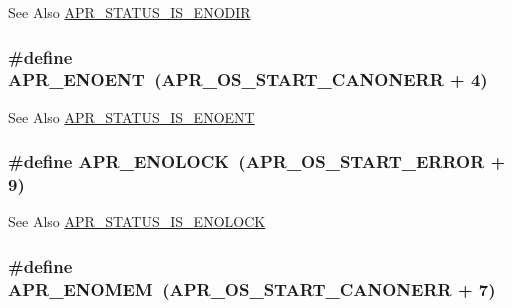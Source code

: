 \begin{DoxySeeAlso}{See Also}
\hyperlink{group___a_p_r___s_t_a_t_u_s___i_s_ga666c0bcfb97d26df7e7e360041d93fc6}{A\-P\-R\-\_\-\-S\-T\-A\-T\-U\-S\-\_\-\-I\-S\-\_\-\-E\-N\-O\-D\-I\-R} 
\end{DoxySeeAlso}
\hypertarget{group___a_p_r___error_gacc26a4afe01b6cc141f839be71fddf1c}{
\subsubsection[{A\-P\-R\-\_\-\-E\-N\-O\-E\-N\-T}]{\setlength{\rightskip}{0pt plus 5cm}\#define A\-P\-R\-\_\-\-E\-N\-O\-E\-N\-T~({\bf A\-P\-R\-\_\-\-O\-S\-\_\-\-S\-T\-A\-R\-T\-\_\-\-C\-A\-N\-O\-N\-E\-R\-R} + 4)}}\label{group___a_p_r___error_gacc26a4afe01b6cc141f839be71fddf1c}
\begin{DoxySeeAlso}{See Also}
\hyperlink{group___a_p_r___s_t_a_t_u_s___i_s_gad15c3b9bda78a88c02466a0d405c6047}{A\-P\-R\-\_\-\-S\-T\-A\-T\-U\-S\-\_\-\-I\-S\-\_\-\-E\-N\-O\-E\-N\-T} 
\end{DoxySeeAlso}
\hypertarget{group___a_p_r___error_ga9c411624c42f7562a5c6c3461bdcb0ec}{
\subsubsection[{A\-P\-R\-\_\-\-E\-N\-O\-L\-O\-C\-K}]{\setlength{\rightskip}{0pt plus 5cm}\#define A\-P\-R\-\_\-\-E\-N\-O\-L\-O\-C\-K~({\bf A\-P\-R\-\_\-\-O\-S\-\_\-\-S\-T\-A\-R\-T\-\_\-\-E\-R\-R\-O\-R} + 9)}}\label{group___a_p_r___error_ga9c411624c42f7562a5c6c3461bdcb0ec}
\begin{DoxySeeAlso}{See Also}
\hyperlink{group___a_p_r___s_t_a_t_u_s___i_s_gaced66cdb08529210dbf2f6bcbba99258}{A\-P\-R\-\_\-\-S\-T\-A\-T\-U\-S\-\_\-\-I\-S\-\_\-\-E\-N\-O\-L\-O\-C\-K} 
\end{DoxySeeAlso}
\hypertarget{group___a_p_r___error_ga6a453e60000000609a95817efabebf4f}{
\subsubsection[{A\-P\-R\-\_\-\-E\-N\-O\-M\-E\-M}]{\setlength{\rightskip}{0pt plus 5cm}\#define A\-P\-R\-\_\-\-E\-N\-O\-M\-E\-M~({\bf A\-P\-R\-\_\-\-O\-S\-\_\-\-S\-T\-A\-R\-T\-\_\-\-C\-A\-N\-O\-N\-E\-R\-R} + 7)}}\label{group___a_p_r___error_ga6a453e60000000609a95817efabebf4f}
